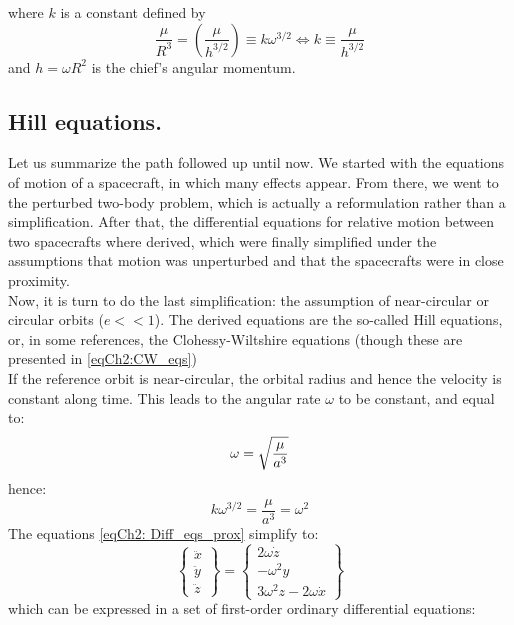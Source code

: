 	\noindent where $k$ is a constant defined by 
	\[
	\dfrac{\mu}{R^3} = \left(\dfrac{\mu }{h^{3/2}}\right) \equiv k \omega^{3/2} \Leftrightarrow k \equiv \dfrac{\mu} {h^{3/2}}
	\]
	\indent and $h = \omega R^2$ is the chief's angular momentum.
	\subsection{Hill equations.}\label{sec:Hill_eqs}
	\indent Let us summarize the path followed up until now. We started with the equations of motion of a spacecraft, in which many effects appear. From there, we went to the perturbed two-body problem, which is actually a reformulation rather than a simplification. After that, the differential equations for relative motion between two spacecrafts where derived, which were finally simplified under the assumptions that motion was unperturbed and that the spacecrafts were in close proximity. \\
	\indent Now, it is turn to do the last simplification: the assumption of near-circular or circular orbits ($e<<1$). The derived equations are the so-called Hill equations, or, in some references, the Clohessy-Wiltshire equations (though these are presented in \ref{eqCh2:CW_eqs})\\
	\indent If the reference orbit is near-circular, the orbital radius and hence the velocity is constant along time. This leads to the angular rate $\omega$ to be constant, and equal to:
	\[
	\omega = \displaystyle\sqrt{\dfrac{\mu}{a^3}}
	\] 
	\noindent hence:
	\begin{equation}
	k \omega^{3/2} = \dfrac{\mu}{a^3} = \omega^2
	\label{eqCh2:omega_k}
	\end{equation}
	\indent The equations \eqref{eqCh2: Diff_eqs_prox} simplify to:\\
	\begin{equation}
	\left\{
	\begin{array}{c}
	\ddot{x}\\
	\ddot{y}\\
	\ddot{z}
	\end{array}\right\}
	= 
	\left\{
	\begin{array}{c}
	 2\omega \dot{z} \\
	-\omega^{2} y \\
	3\omega^{2} z - 2 \omega \dot{x} 
	\end{array}\right\}
	\label{eqCh2:Hill_eqs_V1}
	\end{equation}
	\noindent which can be expressed in a set of first-order ordinary differential equations:
